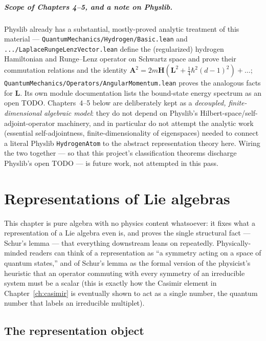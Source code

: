 \paragraph{Scope of Chapters 4--5, and a note on Physlib.} Physlib already
has a substantial, mostly-proved analytic treatment of this material ---
\texttt{QuantumMechanics/Hydrogen/Basic.lean} and
\texttt{.../LaplaceRungeLenzVector.lean} define the (regularized) hydrogen
Hamiltonian and Runge--Lenz operator on Schwartz space and prove their
commutation relations and the identity $\mathbf{A}^2 = 2m\mathbf{H}(\mathbf{L}^2 +
\tfrac14\hbar^2(d-1)^2) + \dots$; \texttt{QuantumMechanics/Operators/AngularMomentum.lean}
proves the analogous facts for $\mathbf L$. Its own module documentation
lists the bound-state energy spectrum as an open TODO. Chapters~4--5 below
are deliberately kept as a \emph{decoupled, finite-dimensional algebraic
model}: they do not depend on Physlib's Hilbert-space/self-adjoint-operator
machinery, and in particular do not attempt the analytic work (essential
self-adjointness, finite-dimensionality of eigenspaces) needed to connect a
literal Physlib \texttt{HydrogenAtom} to the abstract representation theory
here. Wiring the two together --- so that this project's classification
theorems discharge Physlib's open TODO --- is future work, not attempted in
this pass.

\chapter{Representations of Lie algebras}

This chapter is pure algebra with no physics content whatsoever: it fixes
what a representation of a Lie algebra even is, and proves the single
structural fact --- Schur's lemma --- that everything downstream leans on
repeatedly. Physically-minded readers can think of a representation as ``a
symmetry acting on a space of quantum states,'' and of Schur's lemma as the
formal version of the physicist's heuristic that an operator commuting with
every symmetry of an irreducible system must be a scalar (this is exactly
how the Casimir element in Chapter~\ref{ch:casimir} is eventually shown to
act as a single number, the quantum number that labels an irreducible
multiplet).

\section{The representation object}
\label{sec:rep-basic}

